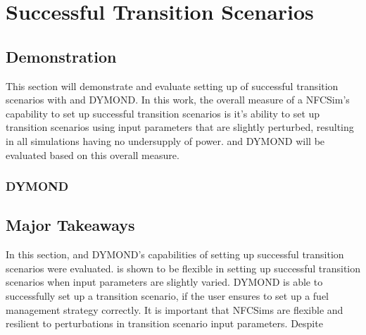 \chapter{Successful Transition Scenarios}

\section{Demonstration}
This section will demonstrate and evaluate 
setting up of successful transition scenarios 
with \Cyclus and DYMOND. 
In this work, the overall measure of a \gls{NFCSim}'s 
capability to set up successful transition scenarios 
is it's ability to set up transition scenarios using 
input parameters that are slightly perturbed, resulting
in all simulations having no undersupply of power. 
\Cyclus and DYMOND will be evaluated based on this 
overall measure. 

\subsection{\Cyclus}

\subsection{DYMOND}


\section{Major Takeaways}
In this section, \Cyclus and DYMOND's capabilities of setting up 
successful transition scenarios were evaluated. 
\Cyclus is shown to be flexible in setting up successful transition 
scenarios when input parameters are slightly varied.
DYMOND is able to successfully set up a transition scenario, if the 
user ensures to set up a fuel management strategy correctly. 
It is important that \glspl{NFCSim} are flexible and resilient to 
perturbations in transition scenario input parameters. 
Despite 

